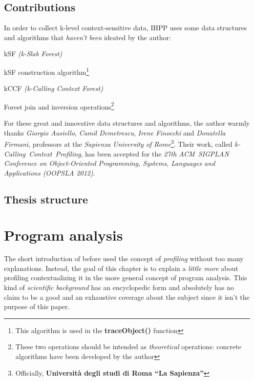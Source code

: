 \documentclass[a4paper,11pt]{report}
\begin{document}
\section{Contributions}

In order to collect k-level context-sensitive data, IHPP uses some data
structures and algorithms that \emph{haven't been} ideated by the author:

\begin{itemize*}
\item kSF \emph{(k-Slab Forest)}
\item kSF construction algorithm\footnote{This algorithm is used in the \textbf{traceObject()} function}
\item kCCF \emph{(k-Calling Context Forest)}
\item Forest join and inversion operations\footnote{These two operations should
be intended as \emph{theoretical} operations: concrete algorithms have been
developed by the author}
\end{itemize*}

For these great and innovative data structures and algorithms, the author warmly
thanks \emph{Giorgio Ausiello}, \emph{Camil Demetrescu}, \emph{Irene Finocchi}
and \emph{Donatella Firmani}, professors at the \emph{Sapienza University of
Rome}\footnote{Officially, \textbf{Universit\`a degli studi di Roma ``La
Sapienza''}}. Their work, called \emph{\mbox{k-Calling Context Profiling}}, has
been accepted for the \emph{27th \mbox{ACM SIGPLAN} Conference on
Object-Oriented Programming, Systems, Languages and Applications (OOPSLA 2012)}.

\section{Thesis structure}

\chapter{Program analysis}
The short introduction of before used the concept of \emph{profiling} without
too many explanations.
Instead, the goal of this chapter is to explain a \emph{little more} about
profiling contextualizing it in the more general concept of program analysis.
This kind of \emph{scientific background} has an encyclopedic form and
absolutely has no claim to be a good and an exhaustive coverage about the
subject since it isn't the purpose of this paper.\\
\end{document}
